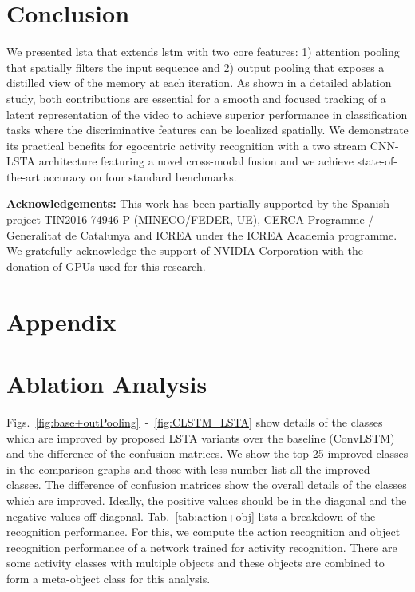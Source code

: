 \documentclass[10pt,twocolumn,letterpaper]{article}
\begin{document}
\section{Conclusion}
\label{sec:conclusion}


We presented \ac{lsta} that extends \ac{lstm} with two core features: 1) attention pooling that spatially filters the input sequence and 2) output pooling that exposes a distilled view of the memory at each iteration. As shown in a detailed ablation study, both contributions are essential for a smooth and focused tracking of a latent representation of the video to achieve superior performance in classification tasks where the discriminative features can be localized spatially. We demonstrate its practical benefits for egocentric activity recognition with a two stream CNN-LSTA architecture featuring a novel cross-modal fusion and we achieve state-of-the-art accuracy on four standard benchmarks. \vskip 1.5mm



{\setlength{\parindent}{0cm}\small{\textbf{Acknowledgements:}
This work has been partially supported by the Spanish project TIN2016-74946-P (MINECO/FEDER, UE), CERCA Programme / Generalitat de Catalunya and ICREA under the ICREA Academia programme. We gratefully acknowledge the support of NVIDIA Corporation with the donation of GPUs used for this research.}}

{\small


}

\section*{Appendix}




	\section{Ablation Analysis}
	Figs.~\ref{fig:base+outPooling}~-~\ref{fig:CLSTM_LSTA} show details of the classes which are improved by proposed LSTA variants over the baseline (ConvLSTM) and the difference of the confusion matrices. We show the top 25 improved classes in the comparison graphs and those with less number list all the improved classes. The difference of confusion matrices show the overall details of the classes which are improved. Ideally, the positive values should be in the diagonal and the negative values off-diagonal. Tab.~\ref{tab:action+obj} lists a breakdown of the recognition performance. For this, we compute the action recognition and object recognition performance of a network trained for activity recognition. There are some activity classes with multiple objects and these objects are combined to form a meta-object class for this analysis.
\end{document}
